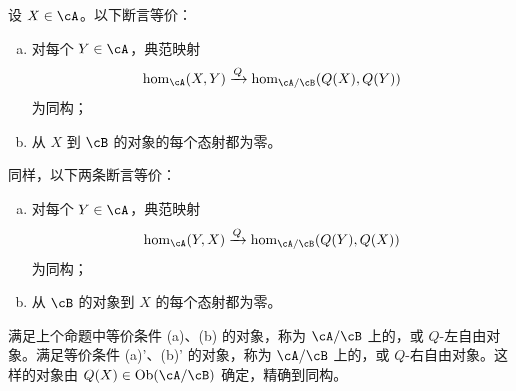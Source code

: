 \begin{proposition}\label{VIII:2-5-3}
设 $X\in\cA$。以下断言等价：
\begin{enumerate}[(a)]
\item 对每个 $Y\in\cA$，典范映射
\[\hom_\cA(X,Y)\xrightarrow{Q}\hom_{\cA/\cB}(Q(X),Q(Y))\]
为同构；
\item 从 $X$ 到 $\cB$ 的对象的每个态射都为零。
\end{enumerate}
同样，以下两条断言等价：
\begin{enumerate}[(a)']
\item 对每个 $Y\in\cA$，典范映射
\[\hom_\cA(Y,X)\xrightarrow{Q}\hom_{\cA/\cB}(Q(Y),Q(X))\]
为同构；
\item 从 $\cB$ 的对象到 $X$ 的每个态射都为零。
\end{enumerate}
\end{proposition}
\begin{definition}\label{VIII:2-5-4}
满足上个命题中等价条件 (a)、(b) 的对象，称为 $\cA/\cB$ 上的，或 $Q$-左自由对象。满足等价条件 (a)'、(b)' 的对象，称为 $\cA/\cB$ 上的，或 $Q$-右自由对象。这样的对象由 $Q(X)\in\operatorname{Ob}(\cA/\cB)$ 确定，精确到同构。
\end{definition}
